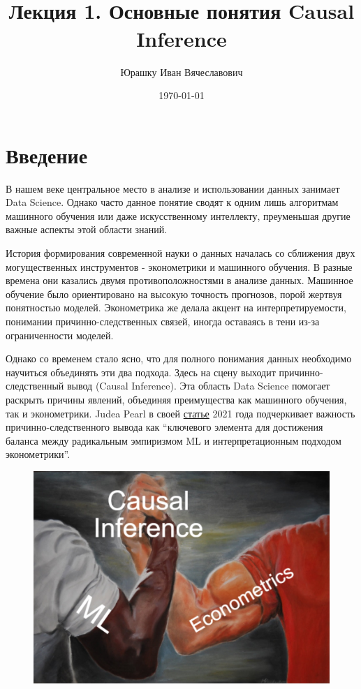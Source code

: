 \documentclass{article}
\title{
    \textbf{\coursename}\\
    Лекция 1.
    Основные понятия Causal Inference
}
\author{Юрашку Иван Вячеславович}
\date{\today}
\begin{document}
    \maketitle
    \section*{Введение}
        В нашем веке центральное место в анализе и использовании данных занимает Data Science.
        Однако часто данное понятие сводят к одним лишь алгоритмам машинного обучения или даже искусственному интеллекту, преуменьшая другие важные аспекты этой области знаний.

        История формирования современной науки о данных началась со сближения двух могущественных инструментов - эконометрики и машинного обучения.
        В разные времена они казались двумя противоположностями в анализе данных.
        Машинное обучение было ориентировано на высокую точность прогнозов, порой жертвуя понятностью моделей.
        Эконометрика же делала акцент на интерпретируемости, понимании причинно-следственных связей, иногда оставаясь в тени из-за ограниченности моделей.

        Однако со временем стало ясно, что для полного понимания данных необходимо научиться объединять эти два подхода.
        Здесь на сцену выходит причинно-следственный вывод (Causal Inference).
        Эта область Data Science помогает раскрыть причины явлений, объединяя преимущества как машинного обучения, так и эконометрики.
        Judea Pearl в своей \href{https://www.degruyter.com/document/doi/10.1515/jci-2021-0006/html}{статье} 2021 года подчеркивает важность причинно-следственного вывода как “ключевого элемента для достижения баланса между радикальным эмпиризмом ML и интерпретационным подходом эконометрики”.

        \begin{figure}[h]
            \centering
            \includegraphics[width=0.7\linewidth]{imgs/epic_CI}
            \label{fig:mpr}
        \end{figure}
        \newpage
\end{document}

